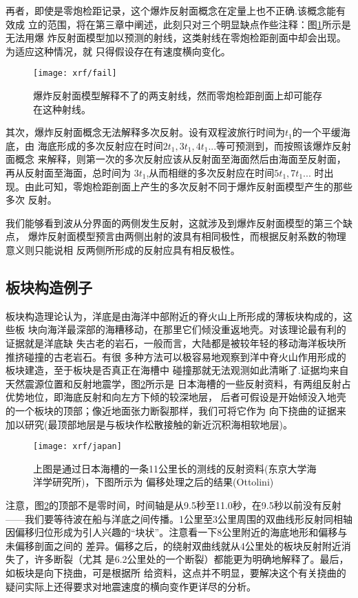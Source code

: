     再者，即使是零炮检距记录，这个爆炸反射面概念在定量上也不正确.该概念能有效成
    立的范围，将在第三章中阐述，此刻只对三个明显缺点作些注释：图\ref{fig:xrf/fail}所示是无法用爆
炸反射面模型加以预测的射线，这类射线在零炮检距剖面中却会出现。为适应这种情况，就
    只得假设存在有速度横向变化。

\begin{figure}[H]
\centering
\texttt{[image: xrf/fail]}
\caption[fail]{
爆炸反射面模型解释不了的两支射线，然而零炮检距剖面上却可能存在这种射线。
}
\label{fig:xrf/fail}
\end{figure}
其次，爆炸反射面概念无法解释多次反射。设有双程波旅行时间为$t_{1}$的一个平缓海底，由
海底形成的多次反射应在时间$2t_{1},3t_{1},4t_{1}...$等可预测到，而按照该爆炸反射面概念
来解释，则第一次的多次反射应该从反射面至海面然后由海面至反射面，再从反射面至海面，总时间为
$3t_{1}$,从而相继的多次反射应在时间$5t_{1},7t_{1}...$
时出现。由此可知，零炮检距剖面上产生的多次反射不同于爆炸反射面模型产生的那些多次
反射。
    
我们能够看到波从分界面的两侧发生反射，这就涉及到爆炸反射面模型的第三个缺点，   
爆炸反射面模型预言由两侧出射的波具有相同极性，而根据反射系数的物理意义则只能说相
反两侧所形成的反射应具有相反极性。    
\subsection*{板块构造例子}
  板块构造理论认为，洋底是由海洋中部附近的脊火山上所形成的薄板块构成的，这些板
  块向海洋最深部的海糟移动，在那里它们倾没重返地壳。对该理论最有利的证据就是洋底缺
  失古老的岩石，一般而言，大陆都是被较年轻的移动海洋板块所推挤碰撞的古老岩石。有很
  多种方法可以极容易地观察到洋中脊火山作用形成的板块建造，至于板块是否真正在海槽中
  碰撞那就无法观测如此清晰了.证据均来自天然震源位置和反射地震学，图\ref{fig:xrf/japan}所示是
  日本海槽的一些反射资料，有两组反射占优势地位，即海底反射和向左方下倾的较深地层，
  后者可假设是开始倾没入地壳的一个板块的顶部；像近地面张力断裂那样，我们可将它作为
  向下挠曲的证据来加以研究(最顶部地层是与板块作松散接触的新近沉积海相软地层)。
  
\begin{figure}[H]
\centering
\texttt{[image: xrf/japan]}
\caption[japan]{
    上图是通过日本海槽的一条11公里长的测线的反射资料(东京大学海洋学研究所)，下图所示为
    偏移处理之后的结果(Ottolini)
  }
\label{fig:xrf/japan}
\end{figure}
  注意，图\ref{fig:xrf/japan}的顶部不是零时间，时间轴是从9.5秒至11.0秒，在9.5秒以前没有反射
——我们要等待波在船与洋底之间传播。1公里至3公里周围的双曲线形反射同相轴因偏移归位形成为引人兴趣的``块状''。注意看一下8公里附近的海底地形和偏移与未偏移剖面之间的
  差异。偏移之后，的绕射双曲线就从4公里处的板块反射附近消失了，许多断裂（尤其
  是6.2公里处的一个断裂）都能更为明确地解释了。最后，如板块是向下挠曲，可是根据所
给资料，这点并不明显，要解决这个有关挠曲的疑问实际上还得要求对地震速度的横向变作更详尽的分析。

